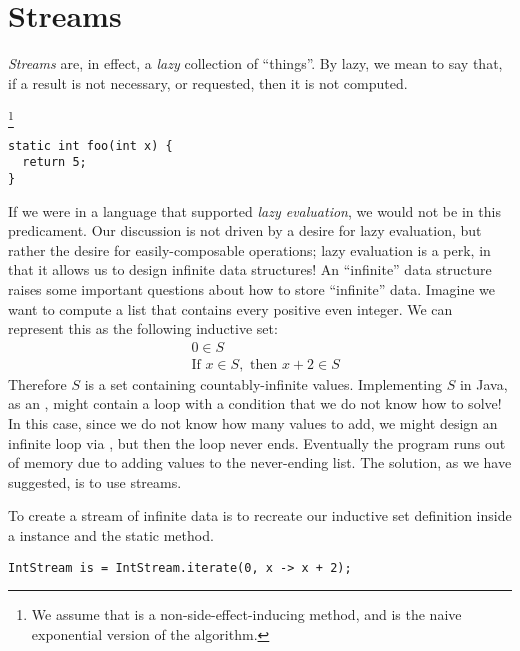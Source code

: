 \section*{Streams}
\textit{Streams} are, in effect, a \textit{lazy} collection of ``things''. By lazy, we mean to say that, if a result is not necessary, or requested, then it is not computed.

\footnote{We assume that  is a non-side-effect-inducing method, and is the naive exponential version of the algorithm.} 
\par{
\begin{verbatim}
static int foo(int x) {
  return 5;
}
\end{verbatim}
}
If we were in a language that supported \textit{lazy evaluation}, we would not be in this predicament. Our discussion is not driven by a desire for lazy evaluation, but rather the desire for easily-composable operations; lazy evaluation is a perk, in that it allows us to design infinite data structures! An ``infinite'' data structure raises some important questions about how to store ``infinite'' data. Imagine we want to compute a list that contains every positive even integer. We can represent this as the following inductive set:
\begin{align*}
    &0 \in S\\
    &\text{If } x \in S,\text{ then }x + 2 \in S
\end{align*}
Therefore $S$ is a set containing countably-infinite values. Implementing $S$ in Java, as an , might contain a  loop with a condition that we do not know how to solve! In this case, since we do not know how many values to add, we might design an infinite loop via , but then the loop never ends. Eventually the program runs out of memory due to adding values to the never-ending list. The solution, as we have suggested, is to use streams.

To create a stream of infinite data is to recreate our inductive set definition inside a  instance and the  static method.

\par{
\begin{verbatim}
IntStream is = IntStream.iterate(0, x -> x + 2);
\end{verbatim}
}

